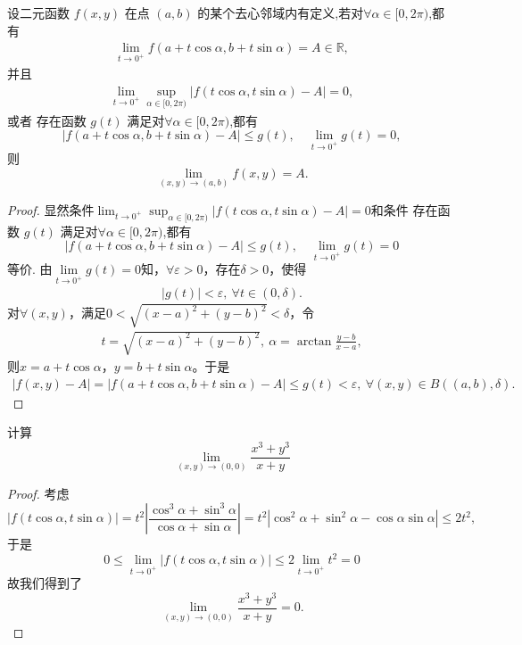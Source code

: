 \documentclass[../../main.tex]{subfiles}%
\begin{document}
\begin{proposition}\label{proposition:二重极限极坐标换元的条件}
设二元函数 \( f(x, y) \) 在点 \( (a, b) \) 的某个去心邻域内有定义,若对$\forall \alpha \in [0, 2\pi)$,都有
\begin{align*}
\underset{t \rightarrow 0^+}{\lim}f\left( a+t\cos \alpha ,b+t\sin \alpha \right) =A\in \mathbb{R},
\end{align*}
并且
\begin{align*}
\lim_{t \to 0^+} \sup_{\alpha \in [0,2\pi)} |f(t\cos\alpha, t\sin\alpha) - A| = 0,
\end{align*}
或者
存在函数 \(g(t)\) 满足对$\forall \alpha \in [0, 2\pi)$,都有
\[
|f(a + t\cos\alpha, b + t\sin\alpha) - A| \leqslant g(t),\quad \lim_{t \to 0^+} g(t) = 0,
\]
则
\[
\lim_{(x, y) \to (a, b)} f(x, y) = A.
\]
\end{proposition}
\begin{proof}

显然条件$\lim_{t \to 0^+} \sup_{\alpha \in [0,2\pi)} |f(t\cos\alpha, t\sin\alpha) - A| = 0$和条件
存在函数 \(g(t)\) 满足对$\forall \alpha \in [0, 2\pi)$,都有
\[
|f(a + t\cos\alpha, b + t\sin\alpha) - A| \leqslant g(t),\quad \lim_{t \to 0^+} g(t) = 0
\]
等价.
由$\lim\limits_{t\rightarrow 0^+}g\left( t \right) =0$知，$\forall \varepsilon >0$，存在$\delta >0$，使得
\begin{align*}
|g(t)| < \varepsilon,\ \forall t \in (0, \delta).
\end{align*}
对$\forall (x, y)$，满足$0 < \sqrt{(x - a)^2 + (y - b)^2} < \delta$，令
\begin{align*}
t = \sqrt{(x - a)^2 + (y - b)^2},\ \alpha = \arctan\frac{y - b}{x - a},
\end{align*}
则$x = a + t\cos\alpha$，$y = b + t\sin\alpha$。于是
\begin{align*}
|f(x, y) - A| = |f(a + t\cos\alpha, b + t\sin\alpha) - A| \leqslant g(t) < \varepsilon,\ \forall (x, y) \in B\left( (a, b), \delta \right).
\end{align*}

\end{proof}

\begin{example}
计算
\[
\lim_{(x,y) \to (0,0)} \frac{x^3 + y^3}{x + y}
\]
\end{example}
\begin{proof}

考虑
\[
|f(t\cos\alpha, t\sin\alpha)| = t^2 \left| \frac{\cos^3 \alpha + \sin^3 \alpha}{\cos\alpha + \sin\alpha} \right| = t^2 |\cos^2 \alpha + \sin^2 \alpha - \cos\alpha \sin\alpha| \leqslant 2t^2,
\]
于是
\[
0 \leqslant \lim_{t \to 0^+} |f(t\cos\alpha, t\sin\alpha)| \leqslant 2 \lim_{t \to 0^+} t^2 = 0
\]
故我们得到了
\[
\lim_{(x,y) \to (0,0)} \frac{x^3 + y^3}{x + y} = 0.
\]

\end{proof}
\end{document}
